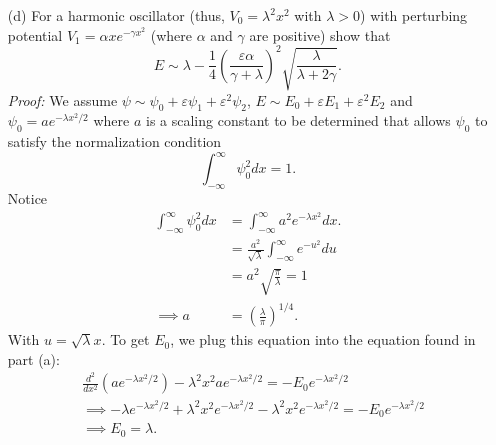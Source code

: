 \documentclass{article}
\begin{document}
\begin{itemize}
\begin{itemize}
        
        

        \item[(d)] For a harmonic oscillator (thus, $V_0 = \lambda^2x^2$ with $\lambda > 0$) with perturbing potential $V_1 = \alpha xe^{-\gamma x^2}$ (where $\alpha$ and $\gamma$ are positive) show that
        \[E \sim \lambda - \frac{1}{4}\left(\frac{\varepsilon\alpha}{\gamma + \lambda}\right)^2\sqrt{\frac{\lambda}{\lambda + 2\gamma}}.\]
        \textit{Proof:} We assume $\psi \sim \psi_0 + \varepsilon \psi_1 + \varepsilon^2\psi_2$, $E \sim E_0 + \varepsilon E_1 + \varepsilon^2E_2$ and $\psi_0 = ae^{-\lambda x^2/2}$ where $a$ is a scaling constant to be determined that allows $\psi_0$ to satisfy the normalization condition
        \[\int_{-\infty}^{\infty}\psi_0^2dx = 1.\]
        Notice
        \begin{align*}
            \int_{-\infty}^{\infty}\psi_0^2dx &= \int_{-\infty}^{\infty}a^2e^{-\lambda x^2}dx.\\
            &= \frac{a^2}{\sqrt{\lambda}}\int_{-\infty}^{\infty}e^{-u^2}du\\
            &= a^2\sqrt{\frac{\pi}{\lambda}} = 1\\
            \implies a &= \left(\frac{\lambda}{\pi}\right)^{1/4}.
        \end{align*}
        With $u = \sqrt{\lambda}x$. To get $E_0$, we plug this equation into the equation found in part (a):
        \begin{align*}
            &\frac{d^2}{dx^2}\left(ae^{-\lambda x^2/2}\right) - \lambda^2x^2ae^{-\lambda x^2/2} = -E_0e^{-\lambda x^2/2}\\
            &\implies -\lambda e^{-\lambda x^2/2} + \lambda^2x^2e^{-\lambda x^2/2} - \lambda^2x^2e^{-\lambda x^2/2} = -E_0e^{-\lambda x^2/2}\\
            &\implies E_0 = \lambda.
        \end{align*}
        
        
        

\end{itemize}
\end{itemize}
\end{document}
